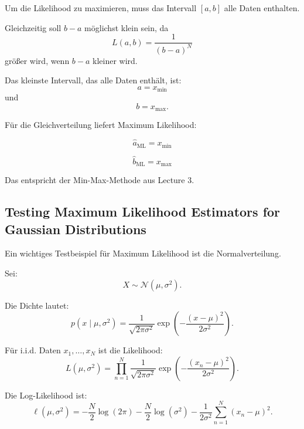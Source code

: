 \documentclass[11pt,a4paper]{scrartcl}
\begin{document}
\begin{calculationbox}
    Um die Likelihood zu maximieren, muss das Intervall \([a,b]\) alle Daten
    enthalten.

    Gleichzeitig soll \(b-a\) möglichst klein sein, da
    \[
        L(a,b)
        =
        \frac{1}{(b-a)^N}
    \]
    größer wird, wenn \(b-a\) kleiner wird.

    Das kleinste Intervall, das alle Daten enthält, ist:
    \[
        a = x_{\min}
    \]
    und
    \[
        b = x_{\max}.
    \]
\end{calculationbox}

\begin{answerbox}
    Für die Gleichverteilung liefert Maximum Likelihood:

    \[
        \boxed{
            \hat a_{\mathrm{ML}}
            =
            x_{\min}
        }
    \]

    \[
        \boxed{
            \hat b_{\mathrm{ML}}
            =
            x_{\max}
        }
    \]

    Das entspricht der Min-Max-Methode aus Lecture 3.
\end{answerbox}

\subsection{Testing Maximum Likelihood Estimators for Gaussian Distributions}

\begin{notebox}
    Ein wichtiges Testbeispiel für Maximum Likelihood ist die Normalverteilung.

    Sei:
    \[
        X \sim \mathcal{N}(\mu,\sigma^2).
    \]

    Die Dichte lautet:
    \[
        p(x \mid \mu,\sigma^2)
        =
        \frac{1}{\sqrt{2\pi\sigma^2}}
        \exp\left(
            -\frac{(x-\mu)^2}{2\sigma^2}
        \right).
    \]
\end{notebox}

\begin{calculationbox}
    Für i.i.d. Daten \(x_1,\dots,x_N\) ist die Likelihood:
    \[
        L(\mu,\sigma^2)
        =
        \prod_{n=1}^{N}
        \frac{1}{\sqrt{2\pi\sigma^2}}
        \exp\left(
            -\frac{(x_n-\mu)^2}{2\sigma^2}
        \right).
    \]

    Die Log-Likelihood ist:
    \[
        \ell(\mu,\sigma^2)
        =
        -\frac{N}{2}\log(2\pi)
        -\frac{N}{2}\log(\sigma^2)
        -\frac{1}{2\sigma^2}
        \sum_{n=1}^{N}(x_n-\mu)^2.
    \]
\end{calculationbox}
\end{document}
